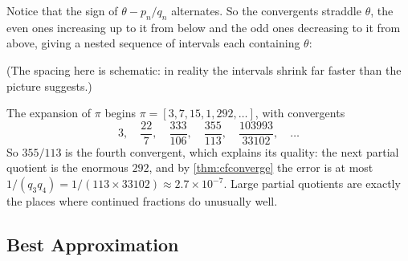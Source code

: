\documentclass[a4paper]{scrartcl}
\begin{document}
Notice that the sign of $\theta - p_n/q_n$ alternates. So the convergents straddle $\theta$, the even ones increasing up to it from below and the odd ones decreasing to it from above, giving a nested sequence of intervals each containing $\theta$:

\begin{center}
\end{center}

(The spacing here is schematic: in reality the intervals shrink far faster than the picture suggests.)

\begin{example}
	The expansion of $\pi$ begins $\pi = [3, 7, 15, 1, 292, \dots]$, with convergents
	$$
	3, \quad \frac{22}7, \quad \frac{333}{106}, \quad \frac{355}{113}, \quad \frac{103993}{33102}, \quad \dots
	$$
	So $355/113$ is the fourth convergent, which explains its quality: the next partial quotient is the enormous $292$, and by \autoref{thm:cfconverge} the error is at most $1/(q_3q_4) = 1/(113 \times 33102) \approx 2.7\times10^{-7}$. Large partial quotients are exactly the places where continued fractions do unusually well.
\end{example}

\subsection{Best Approximation}
\end{document}
